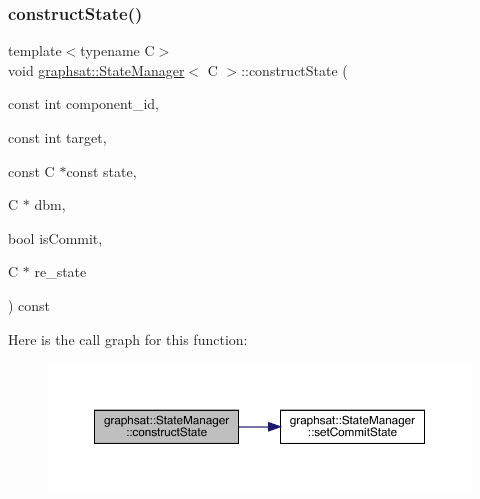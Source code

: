 \subsubsection{\texorpdfstring{constructState()}{constructState()}\hspace{0.1cm}{\footnotesize\ttfamily [1/2]}}
{\footnotesize\ttfamily template$<$typename C$>$ \\
void \mbox{\hyperlink{classgraphsat_1_1_state_manager}{graphsat\+::\+State\+Manager}}$<$ C $>$\+::construct\+State (\begin{DoxyParamCaption}\item[{const int}]{component\+\_\+id,  }\item[{const int}]{target,  }\item[{const C $\ast$const}]{state,  }\item[{C $\ast$}]{dbm,  }\item[{bool}]{is\+Commit,  }\item[{C $\ast$}]{re\+\_\+state }\end{DoxyParamCaption}) const\hspace{0.3cm}{\ttfamily [inline]}}

Here is the call graph for this function\+:
\nopagebreak
\begin{figure}[H]
\begin{center}
\leavevmode
\includegraphics[width=350pt]{classgraphsat_1_1_state_manager_a1940edced635df5cc3bd8bd023a87478_cgraph}
\end{center}
\end{figure}
\mbox{\label{classgraphsat_1_1_state_manager_ad760d94bfbd8b7403b88a850f785f297}} 
